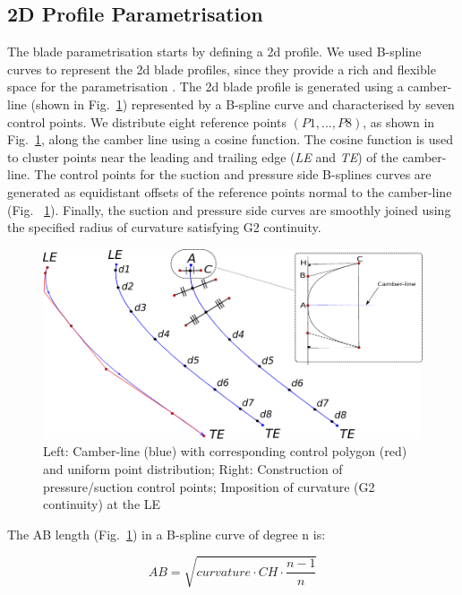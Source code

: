 \documentclass[9pt,academicons]{article}
\begin{document}
\subsection{2D Profile Parametrisation}
The blade parametrisation starts by defining a 2d profile. We used B-spline curves to represent the 2d blade profiles, since they provide a rich and flexible space for the parametrisation \cite{verstreate2010cado}. The 2d blade profile is generated using a camber-line (shown in Fig.~\ref{fig:orestoption}) represented by a B-spline curve and characterised by seven control points. We distribute eight reference points $(P1,...,P8)$, as shown in Fig.~\ref{fig:orestoption}, along the camber line using a cosine function. The cosine function is used to cluster points near the leading and trailing edge (\textit{LE} and \textit{TE}) of the camber-line. The control points for the suction and pressure side B-splines curves are generated as equidistant offsets of the reference points normal to the camber-line (Fig. ~\ref{fig:orestoption}). Finally, the suction and pressure side curves are smoothly joined using the specified radius of curvature satisfying G2 continuity.


\begin{figure}[h!]
\centering
 \includegraphics[height=.25\textheight]{img/salvi3.pdf}
\caption{Left: Camber-line (blue) with corresponding control polygon (red) and uniform point distribution; Right: Construction of pressure/suction control points; Imposition of curvature (G2 continuity) at the LE}
\label{fig:orestoption}
\end{figure}

\noindent
The AB length (Fig.~\ref{fig:orestoption}) in a B-spline curve of degree n is:

\begin{equation}
AB = \sqrt{curvature \cdot CH \cdot \frac{n-1}{n}}
\end{equation}
\end{document}
